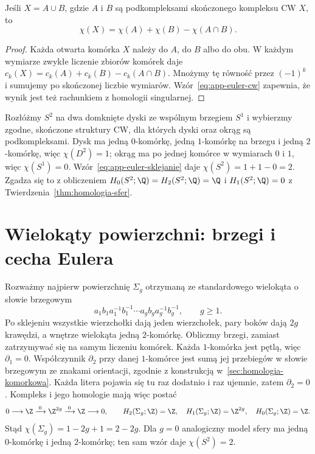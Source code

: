 \begin{stwierdzenie}
\label{prop:app-euler-addytywnosc}
Jeśli $X=A\cup B$, gdzie $A$ i $B$ są podkompleksami skończonego
kompleksu CW $X$, to
\begin{equation}\label{eq:app-euler-sklejanie}
 \chi(X)=\chi(A)+\chi(B)-\chi(A\cap B).
\end{equation}
\end{stwierdzenie}
\begin{proof}
Każda otwarta komórka $X$ należy do $A$, do $B$ albo do obu.
W każdym wymiarze zwykłe liczenie zbiorów komórek daje
$c_k(X)=c_k(A)+c_k(B)-c_k(A\cap B)$.
Mnożymy tę równość przez $(-1)^k$ i sumujemy po skończonej liczbie
wymiarów. Wzór~\eqref{eq:app-euler-cw} zapewnia, że wynik jest też
rachunkiem z homologii singularnej.
\end{proof}

\begin{przyklad}
Rozłóżmy $S^2$ na dwa domknięte dyski ze wspólnym brzegiem $S^1$
i wybierzmy zgodne, skończone struktury CW, dla których dyski oraz
okrąg są podkompleksami. Dysk ma jedną $0$-komórkę, jedną
$1$-komórkę na brzegu i jedną $2$-komórkę, więc $\chi(D^2)=1$;
okrąg ma po jednej komórce w wymiarach $0$ i $1$, więc
$\chi(S^1)=0$. Wzór~\eqref{eq:app-euler-sklejanie} daje
$\chi(S^2)=1+1-0=2$. Zgadza się to z obliczeniem
$H_0(S^2;\Q)=H_2(S^2;\Q)=\Q$ i $H_1(S^2;\Q)=0$
z Twierdzenia~\ref{thm:homologia-sfer}.
\end{przyklad}

\section{Wielokąty powierzchni: brzegi i cecha Eulera}
\label{sec:app-euler-powierzchnie}

Rozważmy najpierw powierzchnię $\Sigma_g$ otrzymaną ze standardowego
wielokąta o słowie brzegowym
\[
 a_1b_1a_1^{-1}b_1^{-1}\cdots
 a_gb_ga_g^{-1}b_g^{-1},\qquad g\geq1.
\]
Po sklejeniu wszystkie wierzchołki dają jeden wierzchołek,
pary boków dają $2g$ krawędzi, a wnętrze wielokąta jedną
$2$-komórkę. Obliczmy brzegi, zamiast zatrzymywać się na samym
liczeniu komórek. Każda $1$-komórka jest pętlą, więc
$\partial_1=0$. Współczynnik $\partial_2$ przy danej
$1$-komórce jest sumą jej przebiegów w słowie brzegowym ze znakami
orientacji, zgodnie z konstrukcją w~\ref{sec:homologia-komorkowa}.
Każda litera pojawia się tu raz dodatnio i raz ujemnie, zatem
$\partial_2=0$. Kompleks i jego homologie mają więc postać
\[
 0\longrightarrow\Z\xrightarrow{\;0\;}\Z^{2g}
 \xrightarrow{\;0\;}\Z\longrightarrow0,
 \qquad
 H_2(\Sigma_g;\Z)=\Z,\quad
 H_1(\Sigma_g;\Z)=\Z^{2g},\quad
 H_0(\Sigma_g;\Z)=\Z.
\]
Stąd $\chi(\Sigma_g)=1-2g+1=2-2g$.
Dla $g=0$ analogiczny model sfery ma jedną $0$-komórkę
i jedną $2$-komórkę; ten sam wzór daje $\chi(S^2)=2$.

